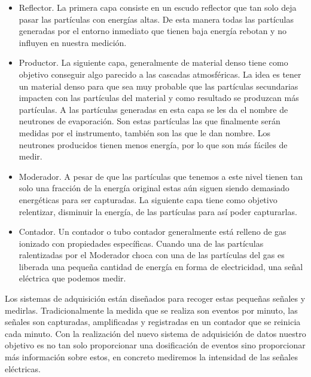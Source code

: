 	\begin{itemize}
		\item   Reflector. La primera capa consiste en un escudo reflector que tan solo deja pasar las partículas con energías altas. De 
		        esta manera todas las partículas generadas por el entorno inmediato que tienen baja energía rebotan y no influyen en nuestra 
			medición. 
		\item   Productor. La siguiente capa, generalmente de material denso tiene como objetivo conseguir algo parecido a las cascadas 
		        atmosféricas. La idea es tener un material denso para que sea muy probable que las partículas secundarias impacten con las partículas 
			del material y como resultado se produzcan más partículas. A las partículas generadas en esta capa se les da el nombre de
			neutrones de evaporación. Son estas partículas las que finalmente serán medidas por el instrumento, también son las que le dan
			nombre. Los neutrones producidos tienen menos energía, por lo que son más fáciles de medir. 
		\item   Moderador. A pesar de que las partículas que tenemos a este nivel tienen tan solo una fracción de la energía original estas
		        aún siguen siendo demasiado energéticas para ser capturadas. La siguiente capa tiene como objetivo relentizar, disminuir 
			la energía, de las partículas para así poder capturarlas.
		\item   Contador. Un contador o tubo contador generalmente está relleno de gas ionizado con propiedades específicas. Cuando una de 
		  	las partículas ralentizadas por el Moderador choca con una de las partículas del gas es liberada una pequeña cantidad de
			energía en forma de electricidad, una señal eléctrica que podemos medir.
      	\end{itemize}
	Los sistemas de adquisición están diseñados para recoger estas pequeñas señales y medirlas. Tradicionalmente la medida que se realiza son 
	eventos por minuto, las señales son capturadas, amplificadas y registradas en un contador que se reinicia cada minuto. Con la realización
	del nuevo sistema de adquisición de datos nuestro objetivo es no tan solo proporcionar una dosificación de eventos sino proporcionar más 
	información sobre estos, en concreto mediremos la intensidad de las señales eléctricas. 


